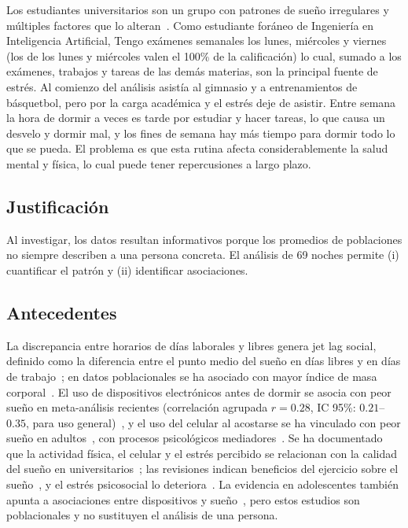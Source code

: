 \documentclass[conference]{IEEEtran}
\begin{document}
Los estudiantes universitarios son un grupo con patrones de sueño irregulares y múltiples factores que lo alteran~\cite{ref5,ref6}. Como estudiante foráneo de Ingeniería en Inteligencia Artificial, Tengo exámenes semanales los lunes, miércoles y viernes (los de los lunes y miércoles valen el 100\% de la calificación) lo cual, sumado a los exámenes, trabajos y tareas de las demás materias, son la principal fuente de estrés. Al comienzo del análisis asistía al gimnasio y a entrenamientos de básquetbol, pero por la carga académica y el estrés deje de asistir. Entre semana la hora de dormir a veces es tarde por estudiar y hacer tareas, lo que causa un desvelo y dormir mal, y los fines de semana hay más tiempo para dormir todo lo que se pueda. El problema es que esta rutina afecta considerablemente la salud mental y física, lo cual puede tener repercusiones a largo plazo. 

\subsection{Justificación}
Al investigar, los datos resultan informativos porque los promedios de poblaciones no siempre describen a una persona concreta. El análisis de 69 noches permite (i) cuantificar el patrón y (ii) identificar asociaciones.

\subsection{Antecedentes}
La discrepancia entre horarios de días laborales y libres genera jet lag social, definido como la diferencia entre el punto medio del sueño en días libres y en días de trabajo~\cite{ref8}; en datos poblacionales se ha asociado con mayor índice de masa corporal~\cite{ref9}. El uso de dispositivos electrónicos antes de dormir se asocia con peor sueño en meta-análisis recientes (correlación agrupada $r=0.28$, IC 95\%: $0.21$--$0.35$, para uso general)~\cite{ref10}, y el uso del celular al acostarse se ha vinculado con peor sueño en adultos~\cite{ref11}, con procesos psicológicos mediadores~\cite{ref12,ref13}. Se ha documentado que la actividad física, el celular y el estrés percibido se relacionan con la calidad del sueño en universitarios~\cite{ref14,ref15}; las revisiones indican beneficios del ejercicio sobre el sueño~\cite{ref16}, y el estrés psicosocial lo deteriora~\cite{ref17}. La evidencia en adolescentes también apunta a asociaciones entre dispositivos y sueño~\cite{ref18,ref19}, pero estos estudios son poblacionales y no sustituyen el análisis de una persona.
\end{document}
